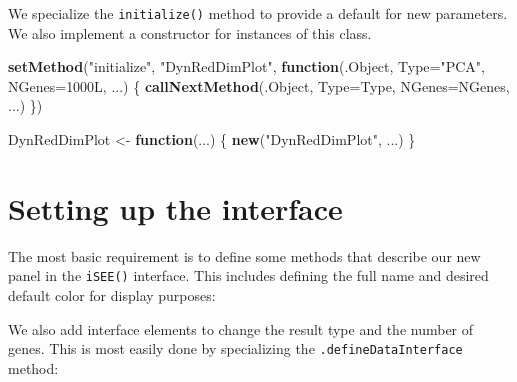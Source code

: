 \documentclass[
]{book}
\newenvironment{Shaded}{\begin{snugshade}}{\end{snugshade}}
\newcommand{\ControlFlowTok}[1]{\textcolor[rgb]{0.13,0.29,0.53}{\textbf{#1}}}
\newcommand{\DataTypeTok}[1]{\textcolor[rgb]{0.13,0.29,0.53}{#1}}
\newcommand{\KeywordTok}[1]{\textcolor[rgb]{0.13,0.29,0.53}{\textbf{#1}}}
\newcommand{\NormalTok}[1]{#1}
\newcommand{\StringTok}[1]{\textcolor[rgb]{0.31,0.60,0.02}{#1}}
\begin{document}
We specialize the \texttt{initialize()} method to provide a default for new parameters.
We also implement a constructor for instances of this class.

\begin{Shaded}
\begin{Highlighting}[]
\KeywordTok{setMethod}\NormalTok{(}\StringTok{"initialize"}\NormalTok{, }\StringTok{"DynRedDimPlot"}\NormalTok{, }
    \ControlFlowTok{function}\NormalTok{(.Object, }\DataTypeTok{Type=}\StringTok{"PCA"}\NormalTok{, }\DataTypeTok{NGenes=}\NormalTok{1000L, ...) }
\NormalTok{\{}
    \KeywordTok{callNextMethod}\NormalTok{(.Object, }\DataTypeTok{Type=}\NormalTok{Type, }\DataTypeTok{NGenes=}\NormalTok{NGenes, ...)}
\NormalTok{\})}

\NormalTok{DynRedDimPlot <-}\StringTok{ }\ControlFlowTok{function}\NormalTok{(...) \{}
    \KeywordTok{new}\NormalTok{(}\StringTok{"DynRedDimPlot"}\NormalTok{, ...)}
\NormalTok{\}}
\end{Highlighting}
\end{Shaded}

\hypertarget{setting-up-the-interface}{%
\section{Setting up the interface}\label{setting-up-the-interface}}

The most basic requirement is to define some methods that describe our new panel in the \texttt{iSEE()} interface.
This includes defining the full name and desired default color for display purposes:

\begin{Shaded}
\end{Shaded}

We also add interface elements to change the result type and the number of genes.
This is most easily done by specializing the \texttt{.defineDataInterface} method:
\end{document}
